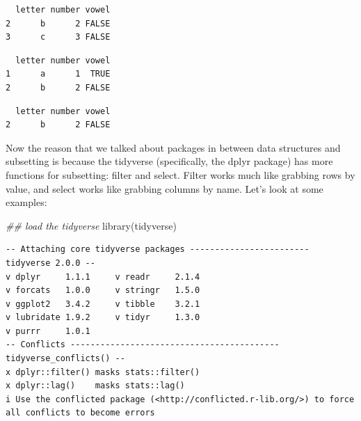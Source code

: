 \documentclass[
  letterpaper,
  DIV=11,
  numbers=noendperiod]{scrreprt}
\newenvironment{Shaded}{\begin{snugshade}}{\end{snugshade}}
\newcommand{\ConstantTok}[1]{\textcolor[rgb]{0.56,0.35,0.01}{#1}}
\newcommand{\DecValTok}[1]{\textcolor[rgb]{0.68,0.00,0.00}{#1}}
\newcommand{\DocumentationTok}[1]{\textcolor[rgb]{0.37,0.37,0.37}{\textit{#1}}}
\newcommand{\FunctionTok}[1]{\textcolor[rgb]{0.28,0.35,0.67}{#1}}
\newcommand{\NormalTok}[1]{\textcolor[rgb]{0.00,0.23,0.31}{#1}}
\newcommand{\SpecialCharTok}[1]{\textcolor[rgb]{0.37,0.37,0.37}{#1}}
\begin{document}
\begin{verbatim}
  letter number vowel
2      b      2 FALSE
3      c      3 FALSE
\end{verbatim}

\begin{Shaded}
\end{Shaded}

\begin{verbatim}
  letter number vowel
1      a      1  TRUE
2      b      2 FALSE
\end{verbatim}

\begin{Shaded}
\end{Shaded}

\begin{verbatim}
  letter number vowel
2      b      2 FALSE
\end{verbatim}

Now the reason that we talked about packages in between data structures
and subsetting is because the tidyverse (specifically, the dplyr
package) has more functions for subsetting: filter and select. Filter
works much like grabbing rows by value, and select works like grabbing
columns by name. Let's look at some examples:

\begin{Shaded}
\begin{Highlighting}[]
\DocumentationTok{\#\# load the tidyverse}
\FunctionTok{library}\NormalTok{(tidyverse)}
\end{Highlighting}
\end{Shaded}

\begin{verbatim}
-- Attaching core tidyverse packages ------------------------ tidyverse 2.0.0 --
v dplyr     1.1.1     v readr     2.1.4
v forcats   1.0.0     v stringr   1.5.0
v ggplot2   3.4.2     v tibble    3.2.1
v lubridate 1.9.2     v tidyr     1.3.0
v purrr     1.0.1     
-- Conflicts ------------------------------------------ tidyverse_conflicts() --
x dplyr::filter() masks stats::filter()
x dplyr::lag()    masks stats::lag()
i Use the conflicted package (<http://conflicted.r-lib.org/>) to force all conflicts to become errors
\end{verbatim}
\end{document}
